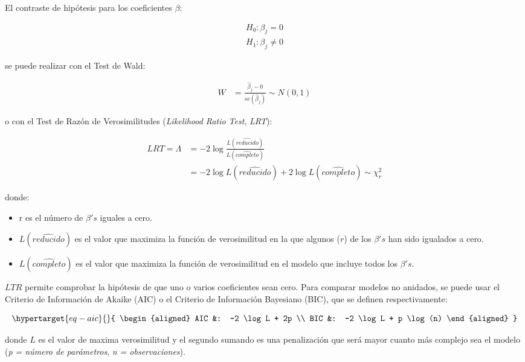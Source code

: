 \documentclass[
  12pt,
  a4paper,
  extrafontsizes,
  onecolumn,
  openright,
  table]{memoir}
\providecommand{\tightlist}{%
  \setlength{\itemsep}{0pt}\setlength{\parskip}{0pt}}\usepackage{longtable,booktabs,array}
\begin{document}
El contraste de hipótesis para los coeficientes \(\beta\):

\[
\begin{aligned}
H_0: \beta_j =  0 \\
H_1: \beta_j \ne  0
\end{aligned}
\]

se puede realizar con el Test de Wald:

\[
\begin{aligned}
W & = \frac{\hat\beta_j - 0}{se(\hat\beta_j)} \sim N(0,1)
\end{aligned}
\]

o con el Test de Razón de Verosimilitudes (\emph{Likelihood Ratio Test},
\emph{\gls{LRT}}):

\[
\begin{aligned}
LRT = \Lambda &= -2 \log \frac{L(\widehat{reducido})}{L(\widehat{completo})}\\
&= -2 \log L(\widehat{reducido}) + 2 \log L(\widehat{completo}) \sim \chi^2_r
\end{aligned}
\]

donde:

\begin{itemize}
\tightlist
\item
  r es el número de \(\beta's\) iguales a cero.
\item
  \(L(\widehat{reducido})\) es el valor que maximiza la función de
  verosimilitud en la que algunos (\(r\)) de los \(\beta's\) han sido
  igualados a cero.
\item
  \(L(\widehat{completo})\) es el valor que maximiza la función de
  verosimilitud en el modelo que incluye todos los \(\beta's\).
\end{itemize}

\(LTR\) permite comprobar la hipótesis de que uno o varios coeficientes
sean cero. Para comparar modelos no anidados, se puede usar el Criterio
de Información de Akaike (AIC) o el Criterio de Información Bayesiano
(BIC), que se definen respectivamente:

\begin{equation}\protect\hypertarget{eq-aic}{}{
\begin{aligned}
AIC &: -2 \log L + 2p \\
BIC &: -2 \log L + p \log(n)
\end{aligned}
}\label{eq-aic}\end{equation}

donde \(L\) es el valor de maxima verosimilitud y el segundo sumando es
una penalización que será mayor cuanto más complejo sea el modelo
(\emph{p = número de parámetros}, \emph{n = observaciones}).
\end{document}
